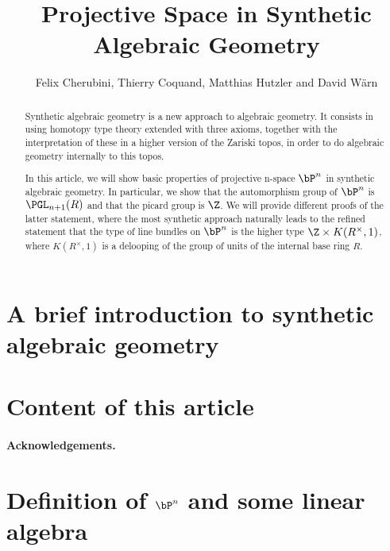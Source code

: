 \documentclass{../util/zariski-small}
\title{Projective Space in Synthetic Algebraic Geometry}
\begin{document}
\author{Felix Cherubini, Thierry Coquand, Matthias Hutzler and David Wärn}

\maketitle

\begin{abstract}
  Synthetic algebraic geometry is a new approach to algebraic geometry. It consists in using homotopy type theory extended with three axioms, together with the interpretation of these in a higher version of the Zariski topos, in order to do algebraic geometry internally to this topos.
  
  In this article, we will show basic properties of projective n-space $\bP^n$ in synthetic algebraic geometry.
  In particular, we show that the automorphism group of $\bP^n$ is $\PGL_{n+1}(R)$ and that the picard group is $\Z$.
  We will provide different proofs of the latter statement, where the most synthetic approach naturally leads to the refined statement that the type of line bundles on $\bP^n$ is the higher type $\Z\times K(R^\times,1)$, where $K(R^\times,1)$ is a delooping of the group of units of the internal base ring $R$.
\end{abstract}

\section*{A brief introduction to synthetic algebraic geometry}


\section*{Content of this article}

\paragraph{Acknowledgements.}


\section[Definition of projective space and some linear algebra]{Definition of $\bP^n$ and some linear algebra}


%
\end{document}
